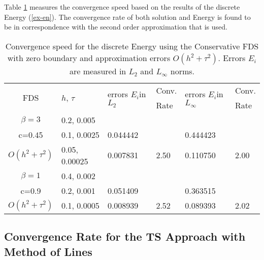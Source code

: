 \documentclass[%
 aip,
cp,  %
 amsmath,amssymb,%
 reprint,%
]{revtex4-2}
\newcommand{\rf}[1]{(\ref{#1})}
\begin{document}
Table \ref{tableD} measures the convergence speed based on the results of the discrete Energy \rf{ex-en}. The convergence rate of both solution and Energy is found to be in correspondence with the second order approximation that is used.

\begin{table}[ht]
\centering
\small
		\begin{tabular}{||c|l|ll|ll||}
			\hline
			\hline
      \multirow{2  }{*}{FDS}        & \multirow{2  }{*}{$h$, $\tau$}  & \multirow{2  }{*}{errors $E_i$in$L_2$}  &Conv.& \multirow{2  }{*}{errors $E_i$in$L_\infty$}  &Conv.  \\
	                                        &                                                     &                                                                 &  Rate &                                                                       & Rate \\
   			\hline 
					\hline 
  $\beta=3$                &0.2, 0.005         &                    &                &                  &                   \\
   c=0.45                     &0.1, 0.0025         & 0.044442   &                & 0.444423  &                   \\
     $O(h^2 + \tau^ 2)$ &0.05, 0.00025  & 0.007831   & 2.50       & 0.110750  & 2.00   \\
	   \hline
			\hline 
       $\beta=1$           & 0.4, 0.002       &                   &           &                 &   \\
                  c=0.9       & 0.2, 0.001        & 0.051409   &          &0.363515  &   \\
  $O(h^2+ \tau^2)$  & 0.1, 0.0005       & 0.008939   & 2.52  &0.089393  & 2.02  \\
	   \hline
			\hline 
		\end{tabular}
		\caption{ Convergence speed for the discrete Energy using the Conservative FDS with zero boundary and approximation errors $O(h^{2} + \tau^2 )$. Errors $E_i$ are measured in $L_2$ and $L_\infty$ norms. }
\label{tableD}
\end{table}

\subsection{Convergence Rate for the TS Approach with Method of Lines}
\end{document}

